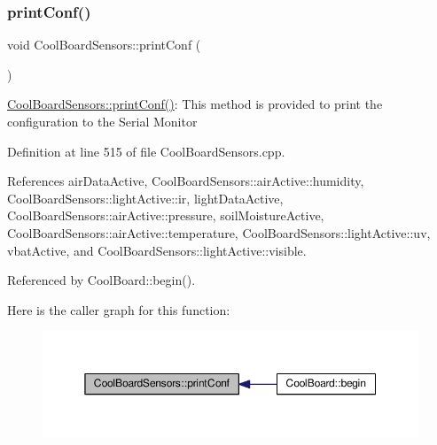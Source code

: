 \subsubsection{\texorpdfstring{print\+Conf()}{printConf()}}
{\footnotesize\ttfamily void Cool\+Board\+Sensors\+::print\+Conf (\begin{DoxyParamCaption}{ }\end{DoxyParamCaption})}

\hyperlink{class_cool_board_sensors_af6fd79505815b204c178617ecf54c873}{Cool\+Board\+Sensors\+::print\+Conf()}\+: This method is provided to print the configuration to the Serial Monitor 

Definition at line 515 of file Cool\+Board\+Sensors.\+cpp.



References air\+Data\+Active, Cool\+Board\+Sensors\+::air\+Active\+::humidity, Cool\+Board\+Sensors\+::light\+Active\+::ir, light\+Data\+Active, Cool\+Board\+Sensors\+::air\+Active\+::pressure, soil\+Moisture\+Active, Cool\+Board\+Sensors\+::air\+Active\+::temperature, Cool\+Board\+Sensors\+::light\+Active\+::uv, vbat\+Active, and Cool\+Board\+Sensors\+::light\+Active\+::visible.



Referenced by Cool\+Board\+::begin().

Here is the caller graph for this function\+:
\nopagebreak
\begin{figure}[H]
\begin{center}
\leavevmode
\includegraphics[width=350pt]{de/d46/class_cool_board_sensors_af6fd79505815b204c178617ecf54c873_icgraph}
\end{center}
\end{figure}
\mbox{\label{class_cool_board_sensors_a406307ffd70272282d91479c7ed8d66f}} 
